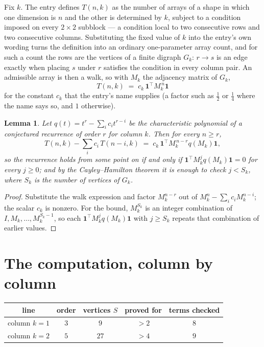 \documentclass[11pt,a4paper]{article}
\theoremstyle{plain}
\newtheorem{lemma}[theorem]{Lemma}
\theoremstyle{definition}
\begin{document}
Fix $k$. The entry defines $T(n,k)$ as the number of arrays of a shape in which one dimension
is $n$ and the other is determined by $k$, subject to a condition imposed on every
$2\times2$ subblock --- a condition local to two consecutive rows and two consecutive columns.
Substituting the fixed value of $k$ into the entry's own wording turns the definition into an
ordinary one-parameter array count, and for such a count the rows are the vertices of a finite
digraph $G_k$: $r\to s$ is an edge exactly when placing $s$ under $r$ satisfies the condition
in every column pair. An admissible array is then a walk, so with $M_k$ the adjacency matrix
of $G_k$,
\[
T(n,k)\;=\;c_k\,\mathbf{1}^{\!\top}M_k^{\,n}\mathbf{1}
\]
for the constant $c_k$ that the entry's name supplies (a factor such as $\tfrac12$ or
$\tfrac14$ where the name says so, and $1$ otherwise).

\begin{lemma}\label{lem:crit}
Let $q(t)=t^{r}-\sum_i c_it^{r-i}$ be the characteristic polynomial of a conjectured
recurrence of order $r$ for column $k$. Then for every $n\ge r$,
\[
T(n,k)-\sum_i c_i\,T(n-i,k)\;=\;c_k\,\mathbf{1}^{\!\top}M_k^{\,n-r}q(M_k)\mathbf{1},
\]
so the recurrence holds from some point on if and only if
$\mathbf{1}^{\!\top}M_k^{j}q(M_k)\mathbf{1}=0$ for every $j\ge0$; and by the
Cayley--Hamilton theorem it is enough to check $j<S_k$, where $S_k$ is the number of vertices
of $G_k$.
\end{lemma}

\begin{proof}
Substitute the walk expression and factor $M_k^{n-r}$ out of $M_k^{n}-\sum_ic_iM_k^{n-i}$;
the scalar $c_k$ is nonzero. For the bound, $M_k^{S_k}$ is an integer combination of
$I,M_k,\dots,M_k^{S_k-1}$, so each $\mathbf{1}^{\!\top}M_k^{j}q(M_k)\mathbf{1}$ with
$j\ge S_k$ repeats that combination of earlier values.
\end{proof}

\section{The computation, column by column}

\begin{center}
\begin{tabular}{ccccc}
line & order & vertices $S$ & proved for & terms checked \\ \hline
column $k$$=1$ & $3$ & $9$ & $>2$ & $8$ \\
column $k$$=2$ & $5$ & $27$ & $>4$ & $9$ \\
\end{tabular}
\end{center}
\end{document}
